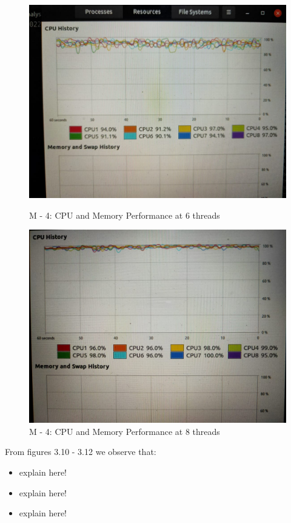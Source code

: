 \documentclass[paper=a4, fontsize = 12pt]{scrartcl}
\numberwithin{equation}{section}		%
\numberwithin{figure}{section}			%
\numberwithin{table}{section}				%
\begin{document}
\begin{figure}[H]
    \centering
    \captionsetup{justification=centering,margin=2cm}
    
    \includegraphics[width = 14cm]{4_6.jpeg}
    \caption{M - 4: CPU and Memory Performance at 6 threads}
    \label{fig:M4CPUT6}
    
    \includegraphics[width = 14cm]{4_8.jpeg}
    \caption{M - 4: CPU and Memory Performance at 8 threads}
    \label{fig:M4CPUT6}
\end{figure}

From figures 3.10 - 3.12 we observe that: 
\begin{itemize}
    \item explain here!
    
    \item explain here!
    
    \item explain here!
\end{itemize}
\end{document}
